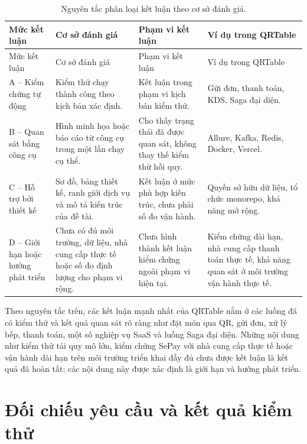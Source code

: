 {\footnotesize\sloppy
\setlength{\tabcolsep}{3pt}
\begin{longtable}{>{\raggedright\arraybackslash}p{}>{\raggedright\arraybackslash}p{}>{\raggedright\arraybackslash}p{}>{\raggedright\arraybackslash}p{}}
  \caption{Nguyên tắc phân loại kết luận theo cơ sở đánh giá.}
  \label{tab:chapter6-evidence-policy}\\
  \toprule
  Mức kết luận & Cơ sở đánh giá & Phạm vi kết luận & Ví dụ trong QRTable \\
  \midrule
  \endfirsthead
  \toprule
  Mức kết luận & Cơ sở đánh giá & Phạm vi kết luận & Ví dụ trong QRTable \\
  \midrule
  \endhead
  \bottomrule
  \endfoot
  A -- Kiểm chứng tự động & Kiểm thử chạy thành công theo kịch bản xác định. & Kết luận trong phạm vi kịch bản kiểm thử. & Gửi đơn, thanh toán, KDS, Saga đại diện. \\
  B -- Quan sát bằng công cụ & Hình minh họa hoặc báo cáo từ công cụ trong một lần chạy cụ thể. & Cho thấy trạng thái đã được quan sát, không thay thế kiểm thử hồi quy. & Allure, Kafka, Redis, Docker, Vercel. \\
  C -- Hỗ trợ bởi thiết kế & Sơ đồ, bảng thiết kế, ranh giới dịch vụ và mô tả kiến trúc của đề tài. & Kết luận ở mức phù hợp kiến trúc, chưa phải số đo vận hành. & Quyền sở hữu dữ liệu, tổ chức monorepo, khả năng mở rộng. \\
  D -- Giới hạn hoặc hướng phát triển & Chưa có đủ môi trường, dữ liệu, nhà cung cấp thực tế hoặc số đo định lượng cho phạm vi rộng. & Chưa hình thành kết luận kiểm chứng ngoài phạm vi hiện tại. & Kiểm chứng dài hạn, nhà cung cấp thanh toán thực tế, khả năng quan sát ở môi trường vận hành thực tế. \\
\end{longtable}
}

Theo nguyên tắc trên, các kết luận mạnh nhất của QRTable nằm ở các luồng đã có kiểm thử và kết quả quan sát rõ ràng như đặt món qua QR, gửi đơn, xử lý bếp, thanh toán, một số nghiệp vụ SaaS và luồng Saga đại diện. Những nội dung như kiểm thử tải quy mô lớn, kiểm chứng SePay với nhà cung cấp thực tế hoặc vận hành dài hạn trên môi trường triển khai đầy đủ chưa được kết luận là kết quả đã hoàn tất; các nội dung này được xác định là giới hạn và hướng phát triển.

\section{Đối chiếu yêu cầu và kết quả kiểm thử}

